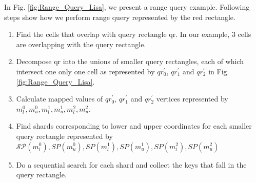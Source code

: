 \begin{mscexample}
	In Fig. \ref{fig:Range_Query_Lisa}, we present a range query example. Following steps show how we perform range query represented by the red rectangle.
	\begin{enumerate}
		\item Find the cells that overlap with query rectangle qr. In our example, 3 cells are overlapping with the query rectangle. 
		\item Decompose qr into the unions of smaller query rectangles, each of which intersect one only one cell as represented by $qr_{0}^{'}$, $qr_{1}^{'}$ and $qr_{2}^{'}$ in Fig. \ref{fig:Range_Query_Lisa}.
		
		\item Calculate mapped values of $qr_{0}^{'}$, $qr_{1}^{'}$ and $qr_{2}^{'}$ vertices represented by \\
		$m_{l}^{0}, m_{u}^{0}, m_{l}^{1}, m_{u}^{1}, m_{l}^{2}, m_{u}^{2} $.
		\item Find shards corresponding to lower and upper coordinates for each smaller query rectangle represented by 
		$\mathcal{SP}(m_{l}^{0}),SP{(m_{u}^{0})},{SP}(m_{l}^{1}),SP{(m_{u}^{1})}, {SP}(m_{l}^{2}),SP{(m_{u}^{2})} $
		\item Do a sequential search for  each shard and collect the keys that fall in the query rectangle. 
	\end{enumerate}
\end{mscexample}

